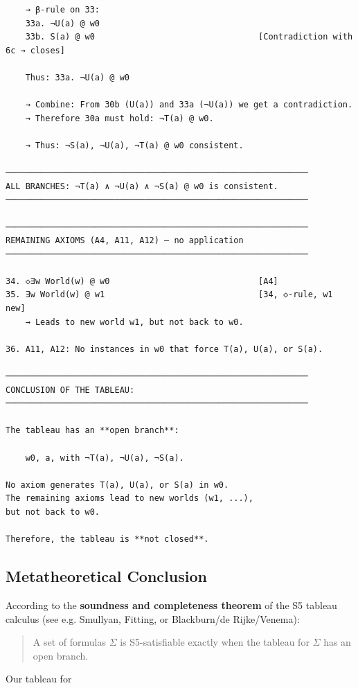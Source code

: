 \documentclass[
]{article}
\begin{document}
\begin{verbatim}
    → β-rule on 33:
    33a. ¬U(a) @ w0
    33b. S(a) @ w0                                 [Contradiction with 6c → closes]

    Thus: 33a. ¬U(a) @ w0

    → Combine: From 30b (U(a)) and 33a (¬U(a)) we get a contradiction.
    → Therefore 30a must hold: ¬T(a) @ w0.

    → Thus: ¬S(a), ¬U(a), ¬T(a) @ w0 consistent.

─────────────────────────────────────────────────────────────
ALL BRANCHES: ¬T(a) ∧ ¬U(a) ∧ ¬S(a) @ w0 is consistent.
─────────────────────────────────────────────────────────────

─────────────────────────────────────────────────────────────
REMAINING AXIOMS (A4, A11, A12) – no application
─────────────────────────────────────────────────────────────

34. ◇∃w World(w) @ w0                              [A4]
35. ∃w World(w) @ w1                               [34, ◇-rule, w1 new]
    → Leads to new world w1, but not back to w0.

36. A11, A12: No instances in w0 that force T(a), U(a), or S(a).

─────────────────────────────────────────────────────────────
CONCLUSION OF THE TABLEAU:
─────────────────────────────────────────────────────────────

The tableau has an **open branch**:

    w0, a, with ¬T(a), ¬U(a), ¬S(a).

No axiom generates T(a), U(a), or S(a) in w0.
The remaining axioms lead to new worlds (w1, ...),
but not back to w0.

Therefore, the tableau is **not closed**.
\end{verbatim}

\subsection{Metatheoretical Conclusion}

According to the \textbf{soundness and completeness theorem} of the S5 tableau calculus
(see e.g. Smullyan, Fitting, or Blackburn/de Rijke/Venema):

\begin{quote}
A set of formulas \(\Sigma\) is S5-satisfiable exactly when the tableau for \(\Sigma\) has an open branch.
\end{quote}

Our tableau for
\end{document}
